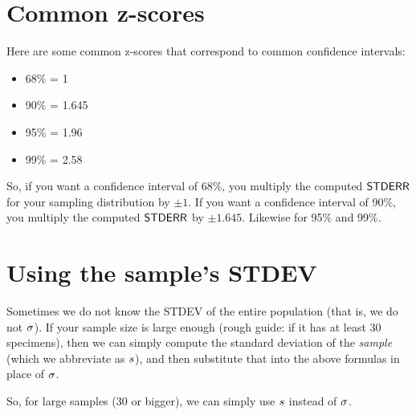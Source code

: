 \documentclass[../../../main.tex]{subfiles}
\begin{document}
\section{Common z-scores}

Here are some common z-scores that correspond to common confidence intervals:

\begin{itemize}
  \item 68\% = 1
  \item 90\% = 1.645
  \item 95\% = 1.96
  \item 99\% = 2.58
\end{itemize}

\noindent
So, if you want a confidence interval of 68\%, you multiply the computed $\StdErr/$ for your sampling distribution by $\pm 1$. If you want a confidence interval of 90\%, you multiply the computed $\StdErr/$ by $\pm 1.645$. Likewise for 95\% and 99\%.


\section{Using the sample's STDEV}

Sometimes we do not know the STDEV of the entire population (that is, we do not $\sigma$). If your sample size is large enough (rough guide: if it has at least 30 specimens), then we can simply compute the standard deviation of the \emph{sample} (which we abbreviate as $s$), and then substitute that into the above formulas in place of $\sigma$. 

So, for large samples (30 or bigger), we can simply use $s$ instead of $\sigma$.
\end{document}

